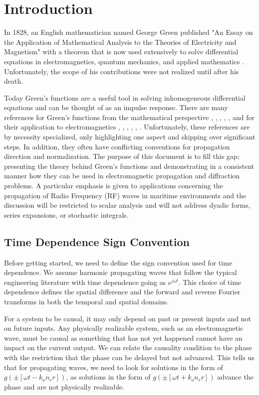 \section{Introduction}
In 1828, an English mathematician named George Green published "An Essay on the Application of Mathematical Analysis to the Theories of Electricity and Magnetism" with a theorem that is now used extensively to solve differential equations in electromagnetics, quantum mechanics, and applied mathematics \cite{green_phys_today}. Unfortunately, the scope of his contributions were not realized until after his death. 

Today Green's functions are a useful tool in solving inhomogeneous differential equations and can be thought of as an impulse response. There are many references for Green's functions from the mathematical perspective \cite{bender_orszag}, \cite{arfken_weber}, \cite{gbur_math}, \cite{guenther_partial_de}, \cite{duffy_green}, and for their application to electromagnetics \cite{jackson_classical_em}, \cite{zangwill_modern_em}, \cite{balanis_advanced}, \cite{goodman_fourier}, \cite{smith_radiation}, \cite{schwinger_em}. Unfortunately, these references are by necessity specialized, only highlighting one aspect and skipping over significant steps. In addition, they often have conflicting conventions for propagation direction and normalization. The purpose of this document is to fill this gap; presenting the theory behind Green's functions and demonstrating in a consistent manner how they can be used in electromagnetic propagation and diffraction problems. A particular emphasis is given to applications concerning the propagation of Radio Frequency (RF) waves in maritime environments and the discussion will be restricted to scalar analysis and will not address dyadic forms, series expansions, or stochastic integrals.

\subsection{Time Dependence Sign Convention} \label{gf_sec:time_dependence}
Before getting started, we need to define the sign convention used for time dependence. We  assume harmonic propagating waves that follow the typical engineering literature with time dependence going as $e^{j\omega t}$. This choice of time dependence defines the spatial difference and the forward and reverse Fourier transforms in both the temporal and spatial domains.

For a system to be causal, it may only depend on past or present inputs and not on future inputs. Any physically realizable system, such as an electromagnetic wave, must be causal as something that has not yet happened cannot have an impact on the current output. We can relate the causality condition to the phase with the restriction that the phase can be delayed but not advanced. This tells us that for propagating waves, we need to look for solutions in the form of $g\left(\pm\left[\omega t - k_on_rr\right]\right)$, as solutions in the form of $g\left(\pm\left[\omega t + k_on_rr\right]\right)$ advance the phase and are not physically realizable. 

